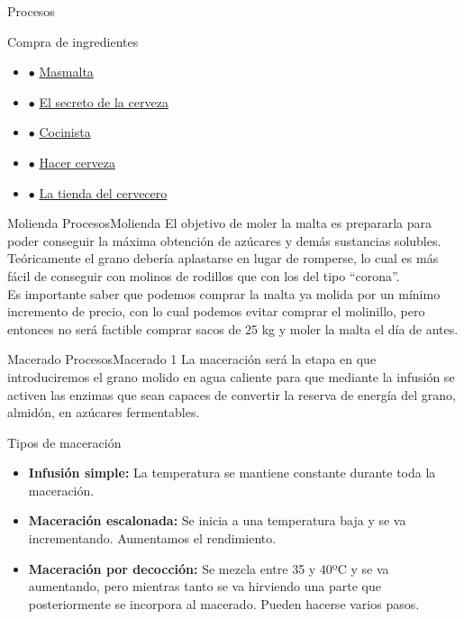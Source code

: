 \begin{frame}[fragile]{Procesos}
\begin{block}{Compra de ingredientes}
\begin{itemize}
  \begin{itemize}
  \item
    \(\bullet\) \href{https://www.masmalta.com/es/}{Masmalta}
  \item
    \(\bullet\) \href{https://elsecretodelacerveza.com/}{El secreto de
    la cerveza}
  \item
    \(\bullet\) \href{https://www.cocinista.es/}{Cocinista}
  \item
    \(\bullet\) \href{https://hacercerveza.com/}{Hacer cerveza}
  \item
    \(\bullet\) \href{https://www.latiendadelcervecero.com/}{La tienda
    del cervecero}
  \end{itemize}
\end{itemize}
\end{block}

\begin{block}{Molienda}
\protect\hypertarget{molienda}{}
ProcesosMolienda El objetivo de moler la malta es prepararla para poder
conseguir la máxima obtención de azúcares y demás sustancias solubles.\\
Teóricamente el grano debería aplastarse en lugar de romperse, lo cual
es más fácil de conseguir con molinos de rodillos que con los del tipo
``corona''.\\
Es importante saber que podemos comprar la malta ya molida por un mínimo
incremento de precio, con lo cual podemos evitar comprar el molinillo,
pero entonces no será factible comprar sacos de 25 kg y moler la malta
el día de antes.
\end{block}

\begin{block}{Macerado}
\protect\hypertarget{macerado}{}
ProcesosMacerado 1 La maceración será la etapa en que introduciremos el
grano molido en agua caliente para que mediante la infusión se activen
las enzimas que sean capaces de convertir la reserva de energía del
grano, almidón, en azúcares fermentables.

Tipos de maceración

\begin{itemize}
\item
  \textbf{Infusión simple:} La temperatura se mantiene constante durante
  toda la maceración.
\item
  \textbf{Maceración escalonada:} Se inicia a una temperatura baja y se
  va incrementando. Aumentamos el rendimiento.
\item
  \textbf{Maceración por decocción:} Se mezcla entre 35 y 40ºC y se va
  aumentando, pero mientras tanto se va hirviendo una parte que
  posteriormente se incorpora al macerado. Pueden hacerse varios pasos.
\end{itemize}
\end{block}


\end{frame}
